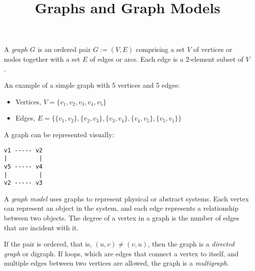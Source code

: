 \documentclass{article}
\begin{document}
\title{Graphs and Graph Models}
\maketitle

A \textit{graph} $G$ is an ordered pair $G :=(V,E)$ comprising a set $V$ of vertices or nodes together with a set $E$ of edges or arcs. Each edge is a 2-element subset of $V$.

An example of a simple graph with 5 vertices and 5 edges:
\begin{itemize}
	\item Vertices, $V = \{v_1, v_2, v_3, v_4, v_5\}$
	\item Edges, $E = \{\{v_1, v_2\}, \{v_2, v_3\}, \{v_3, v_4\}, \{v_4, v_5\}, \{v_5, v_1\}\}$
\end{itemize}

A graph can be represented visually:
\begin{verbatim}
v1 ----- v2
|         |
v5 ----- v4
|         |
v2 ----- v3
\end{verbatim}

A \textit{graph model} uses graphs to represent physical or abstract systems. Each vertex can represent an object in the system, and each edge represents a relationship between two objects. The degree of a vertex in a graph is the number of edges that are incident with it.

If the pair is ordered, that is, $(u,v)\not= (v,u)$, then the graph is a \textit{directed graph} or digraph. If loops, which are edges that connect a vertex to itself, and multiple edges between two vertices are allowed, the graph is a \textit{multigraph}.
\end{document}
